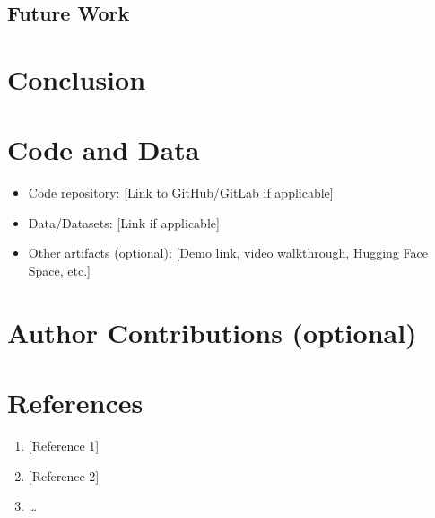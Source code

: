 \documentclass[11pt,a4paper]{article}   %
\newif\ifguidance
\newcommand{\guide}[1]{\ifguidance\textcolor{guidegray}{\itshape #1}\par\medskip\fi}
\begin{document}
\subsection*{Future Work}
\guide{What are the natural next steps? How could this work be extended?}

\section{Conclusion}
\guide{Briefly summarize your main findings and their implications (1--2 paragraphs).}

\section*{Code and Data}
\guide{Include links if applicable. If your project doesn't involve code (e.g.,
policy analysis) or if there are info-hazard considerations, note that here.}
\begin{itemize}[leftmargin=*,itemsep=2pt]
  \item Code repository: [Link to GitHub/GitLab if applicable]
  \item Data/Datasets: [Link if applicable]
  \item Other artifacts (optional): [Demo link, video walkthrough, Hugging Face Space, etc.]
\end{itemize}

\section*{Author Contributions (optional)}
\guide{e.g., ``A.B. led the project and designed experiments. C.D. implemented the
code. All authors contributed to writing and reviewed the final manuscript.''}

\section*{References}
\guide{Use a consistent citation format. Include: Author(s), Year, Title,
Venue/Publisher, and URL or DOI where available.}

\begin{enumerate}[leftmargin=*,itemsep=2pt]
  \item {[Reference 1]}
  \item {[Reference 2]}
  \item \dots
\end{enumerate}
\end{document}
